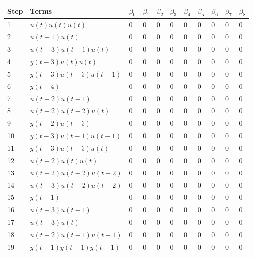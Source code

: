 \begin{tabular}{lllllllllll}
Step & Terms & $\beta_{0}$ & $\beta_{1}$ & $\beta_{2}$ & $\beta_{3}$ & $\beta_{4}$ & $\beta_{5}$ & $\beta_{6}$ & $\beta_{7}$ & $\beta_{8}$ \\ 
\hline 
1 & $u(t)u(t)u(t)$ & 0 & 0 & 0 & 0 & 0 & 0 & 0 & 0 & 0 \\ 
2 & $u(t-1)u(t)$ & 0 & 0 & 0 & 0 & 0 & 0 & 0 & 0 & 0 \\ 
3 & $u(t-3)u(t-1)u(t)$ & 0 & 0 & 0 & 0 & 0 & 0 & 0 & 0 & 0 \\ 
4 & $y(t-3)u(t)u(t)$ & 0 & 0 & 0 & 0 & 0 & 0 & 0 & 0 & 0 \\ 
5 & $y(t-3)u(t-3)u(t-1)$ & 0 & 0 & 0 & 0 & 0 & 0 & 0 & 0 & 0 \\ 
6 & $y(t-4)$ & 0 & 0 & 0 & 0 & 0 & 0 & 0 & 0 & 0 \\ 
7 & $u(t-2)u(t-1)$ & 0 & 0 & 0 & 0 & 0 & 0 & 0 & 0 & 0 \\ 
8 & $u(t-2)u(t-2)u(t)$ & 0 & 0 & 0 & 0 & 0 & 0 & 0 & 0 & 0 \\ 
9 & $y(t-2)u(t-3)$ & 0 & 0 & 0 & 0 & 0 & 0 & 0 & 0 & 0 \\ 
10 & $y(t-3)u(t-1)u(t-1)$ & 0 & 0 & 0 & 0 & 0 & 0 & 0 & 0 & 0 \\ 
11 & $y(t-3)u(t-3)u(t)$ & 0 & 0 & 0 & 0 & 0 & 0 & 0 & 0 & 0 \\ 
12 & $u(t-2)u(t)u(t)$ & 0 & 0 & 0 & 0 & 0 & 0 & 0 & 0 & 0 \\ 
13 & $u(t-2)u(t-2)u(t-2)$ & 0 & 0 & 0 & 0 & 0 & 0 & 0 & 0 & 0 \\ 
14 & $u(t-3)u(t-2)u(t-2)$ & 0 & 0 & 0 & 0 & 0 & 0 & 0 & 0 & 0 \\ 
15 & $y(t-1)$ & 0 & 0 & 0 & 0 & 0 & 0 & 0 & 0 & 0 \\ 
16 & $u(t-3)u(t-1)$ & 0 & 0 & 0 & 0 & 0 & 0 & 0 & 0 & 0 \\ 
17 & $u(t-3)u(t)$ & 0 & 0 & 0 & 0 & 0 & 0 & 0 & 0 & 0 \\ 
18 & $u(t-2)u(t-1)u(t-1)$ & 0 & 0 & 0 & 0 & 0 & 0 & 0 & 0 & 0 \\ 
19 & $y(t-1)y(t-1)y(t-1)$ & 0 & 0 & 0 & 0 & 0 & 0 & 0 & 0 & 0 \\ 
\hline 
\end{tabular}